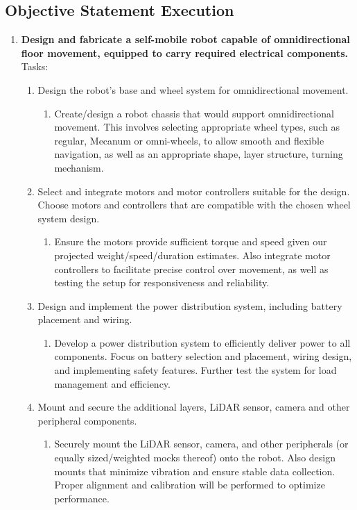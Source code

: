 \documentclass{article}
\begin{document}
\subsection{Objective Statement Execution}
\begin{enumerate}
    \item \textbf{Design and fabricate a self-mobile robot capable of omnidirectional floor movement, equipped to carry required electrical components.}\\
Tasks:
\begin{enumerate}
    \item Design the robot’s base and wheel system for omnidirectional movement.
\begin{enumerate}
    \item Create/design a robot chassis that would support omnidirectional movement. This involves selecting appropriate wheel types, such as regular, Mecanum or omni-wheels, to allow smooth and flexible navigation, as well as an appropriate shape, layer structure, turning mechanism.
\end{enumerate}

\item Select and integrate motors and motor controllers suitable for the design.
Choose motors and controllers that are compatible with the chosen wheel system design. 
\begin{enumerate}
    \item Ensure the motors provide sufficient torque and speed given our projected weight/speed/duration estimates. Also integrate motor controllers to facilitate precise control over movement, as well as testing the setup for responsiveness and reliability.
\end{enumerate}

\item 
Design and implement the power distribution system, including battery placement and wiring.
\begin{enumerate}
    \item Develop a power distribution system to efficiently deliver power to all components. Focus on battery selection and placement, wiring design, and implementing safety features. Further test the system for load management and efficiency.
\end{enumerate}

\item 
Mount and secure the additional layers, LiDAR sensor, camera and other peripheral components.
\begin{enumerate}
    \item Securely mount the LiDAR sensor, camera, and other peripherals (or equally sized/weighted mocks thereof) onto the robot. Also design mounts that minimize vibration and ensure stable data collection. Proper alignment and calibration will be performed to optimize performance. 
\end{enumerate}


\end{enumerate}
\end{enumerate}
\end{document}

